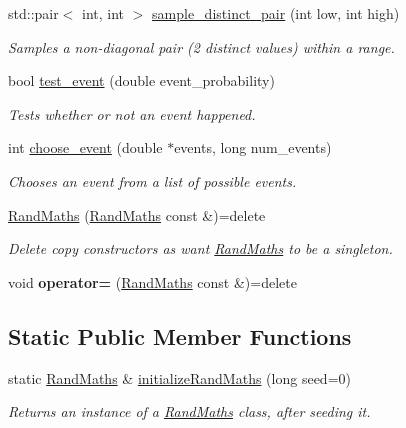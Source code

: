 \begin{DoxyCompactItemize}
std\+::pair$<$ int, int $>$ \mbox{\hyperlink{classrcombinator_1_1RandMaths_aaa759efa3059b6793100cb6b6442f26d}{sample\+\_\+distinct\+\_\+pair}} (int low, int high)
\begin{DoxyCompactList}\small\item\em Samples a non-\/diagonal pair (2 distinct values) within a range. \end{DoxyCompactList}\item 
bool \mbox{\hyperlink{classrcombinator_1_1RandMaths_a183686140a9da18ad40c7e048ee8914e}{test\+\_\+event}} (double event\+\_\+probability)
\begin{DoxyCompactList}\small\item\em Tests whether or not an event happened. \end{DoxyCompactList}\item 
int \mbox{\hyperlink{classrcombinator_1_1RandMaths_afbc0d35bd9744ecab1983914ac32d68c}{choose\+\_\+event}} (double $\ast$events, long num\+\_\+events)
\begin{DoxyCompactList}\small\item\em Chooses an event from a list of possible events. \end{DoxyCompactList}\end{DoxyCompactItemize}
\textbf{ }\par
\begin{DoxyCompactItemize}
\item 
\mbox{\hyperlink{classrcombinator_1_1RandMaths_ac9b350a4aa07b739dcc2bb12c3b5c0e5}{Rand\+Maths}} (\mbox{\hyperlink{classrcombinator_1_1RandMaths}{Rand\+Maths}} const \&)=delete
\begin{DoxyCompactList}\small\item\em Delete copy constructors as want \mbox{\hyperlink{classrcombinator_1_1RandMaths}{Rand\+Maths}} to be a singleton. \end{DoxyCompactList}\item 
\mbox{\label{classrcombinator_1_1RandMaths_ab26d84d79d640cd343ac3e94a70ad184}} 
void {\bfseries operator=} (\mbox{\hyperlink{classrcombinator_1_1RandMaths}{Rand\+Maths}} const \&)=delete
\end{DoxyCompactItemize}

\subsection*{Static Public Member Functions}
\begin{DoxyCompactItemize}
\item 
static \mbox{\hyperlink{classrcombinator_1_1RandMaths}{Rand\+Maths}} \& \mbox{\hyperlink{classrcombinator_1_1RandMaths_aa96396651fba75ffb972b5fa1c2994c7}{initialize\+Rand\+Maths}} (long seed=0)
\begin{DoxyCompactList}\small\item\em Returns an instance of a \mbox{\hyperlink{classrcombinator_1_1RandMaths}{Rand\+Maths}} class, after seeding it. \end{DoxyCompactList}\end{DoxyCompactItemize}


